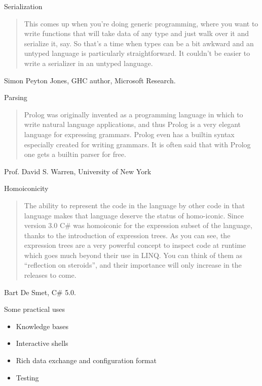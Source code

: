 \documentclass[presentation]{beamer}
\begin{document}
\begin{frame}[label=sec-1-3]{Serialization}
\begin{quote}
This comes up when you're doing generic programming, where you
want to write functions that will take data of any type and just
walk over it and serialize it, say.  So that's a time when types
can be a bit awkward and an untyped language is particularly
straightforward.  It couldn't be easier to write a serializer in
an untyped language.
\end{quote}
Simon Peyton Jones, GHC author, Microsoft Research.
\end{frame}

\begin{frame}[label=sec-1-4]{Parsing}
\begin{quote}
Prolog was originally invented as a programming language in which
to write natural language applications, and thus Prolog is a very
elegant language for expressing grammars.  Prolog even has a
builtin syntax especially created for writing grammars.  It is
often said that with Prolog one gets a builtin parser for free.
\end{quote}
Prof. David S. Warren, University of New York
\end{frame}

\begin{frame}[label=sec-1-5]{Homoiconicity}
\begin{quote}
The ability to represent the code in the language by other code in
that language makes that language deserve the status of
homo-iconic.  Since version 3.0 C\# was homoiconic for the
expression subset of the language, thanks to the introduction of
expression trees.  As you can see, the expression trees are a very
powerful concept to inspect code at runtime which goes much beyond
their use in LINQ.  You can think of them as ``reflection on
steroids'', and their importance will only increase in the
releases to come.
\end{quote}
Bart De Smet, C\# 5.0.
\end{frame}

\begin{frame}[label=sec-1-6]{Some practical uses}
\begin{itemize}
\item Knowledge bases
\item Interactive shells
\item Rich data exchange and configuration format
\item Testing
\end{itemize}
\end{frame}
\end{document}
